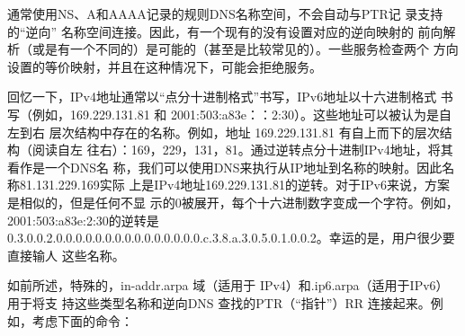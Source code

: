 \begin{tcolorbox}
    通常使用NS、A和AAAA记录的规则DNS名称空间，不会自动与PTR记
    录支持的“逆向” 名称空间连接。因此，有一个现有的没有设置对应的逆向映射的
    前向解析（或是有一个不同的）是可能的（甚至是比较常见的）。一些服务检查两个
    方向设置的等价映射，并且在这种情况下，可能会拒绝服务。
\end{tcolorbox}

回忆一下，IPv4地址通常以“点分十进制格式”书写，IPv6地址以十六进制格式
书写（例如，169.229.131.81 和 2001:503:a83e：：2:30）。这些地址可以被认为是自左到右
层次结构中存在的名称。例如，地址 169.229.131.81 有自上而下的层次结构（阅读自左
往右）：169，229，131，81。通过逆转点分十进制IPv4地址，将其看作是一个DNS名
称，我们可以使用DNS来执行从IP地址到名称的映射。因此名称81.131.229.169实际
上是IPv4地址169.229.131.81的逆转。对于IPv6来说，方案是相似的，但是任何不显
示的0被展开，每个十六进制数字变成一个字符。例如，2001:503:a83e:2:30的逆转是
0.3.0.0.2.0.0.0.0.0.0.0.0.0.0.0.0.0.0.0.c.3.8.a.3.0.5.0.1.0.0.2。幸运的是，用户很少要直接输人
这些名称。

如前所述，特殊的，in-addr.arpa 域（适用于 IPv4）和.ip6.arpa（适用于IPv6）用于将支
持这些类型名称和逆向DNS 查找的PTR（“指针”）RR 连接起来。例如，考虑下面的命令：

